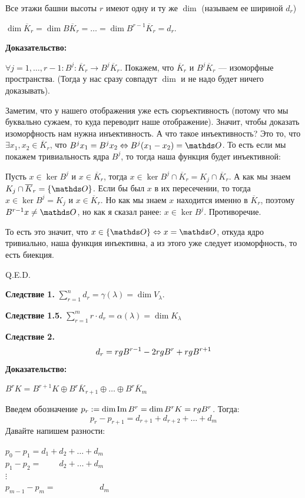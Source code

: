 Все этажи башни высоты $r$ имеют одну и ту же $\dim$ (называем ее шириной $d_r$)

$\dim \overline{K}_r = \dim B \overline{K}_r = \ldots = \dim B^{r-1}\overline{K}_r = d_r$.

\textbf{Доказательство:}

$\forall j=1,\ldots,r-1:B^j: \overline{K}_r \rightarrow B^j\overline{K}_r$. Покажем, что $\overline{K}_r $ и $B^j\overline{K}_r$ --- изоморфные пространства. (Тогда у нас сразу совпадут $\dim$ и не надо будет ничего доказывать).

Заметим, что у нашего отображения уже есть сюръективность (потому что мы буквально сужаем, то куда переводит наше отображение). Значит, чтобы доказать изоморфность нам нужна инъективность. А что такое инъективность? Это то, что $\exists x_1,x_2 \in \overline{K}_r$, что $B^jx_1=B^jx_2 \Leftrightarrow B^j(x_1-x_2)=\zero$. То есть если мы покажем тривиальность ядра $B^j$, то тогда наша функция будет инъективной:

Пусть $x \in \ker B^j$ и $x\in \overline{K}_r$, тогда $x\in \ker B^j \cap \overline{K}_r = K_j \cap \overline{K}_r$. А как мы знаем $ K_j \cap \overline{K}_r = \{\zero\}$. Если бы был $x$ в их пересечении, то тогда $x \in \ker B^j =K_j$ и $x \in \overline{K}_{r}$. Но как мы знаем $x$ находится именно в $\overline{K}_r$, поэтому $B^{r-1}x \neq \zero$, но как я сказал ранее:  $x \in \ker B^j $. Противоречие.

То есть это значит, что $x \in \{\zero\} \Leftrightarrow x =\zero$, откуда ядро тривиально, наша функция инъективна, а из этого уже следует изоморфность, то есть биекция.

\hfill Q.E.D.

\textbf{Следствие 1.} $\sum\limits_{r=1}^nd_r = \gamma(\lambda) = \dim V_{\lambda}$.

\textbf{Следствие 1.5.} $\sum\limits_{r=1}^m r \cdot d_r = \alpha(\lambda)= \dim K_{\lambda}$

\textbf{Следствие 2.} 
$$d_r = rg B^{r-1}-2 rg B^r + rg B^{r+1}$$
\textbf{Доказательство:}

$B^rK = B^{r+1}K \oplus B^r\overline{K}_{r+1}\oplus\ldots\oplus B^r \overline{K}_m$

Введем обозначение $p_r:=\dim \operatorname{Im} B^r = \dim B^rK = rg B^r$. Тогда:
$$p_r - p_{r+1} = d_{r+1}+d_{r+2}+\ldots +d_m$$
Давайте напишем разности:

$p_0-p_1 = d_1 + d_2 +\ldots + d_m$\\
$p_1-p_2 = \quad\quad\, d_2 + \ldots + d_m$\\
$\vdots$\\
$p_{m-1}-p_m = \quad\quad\quad\quad \quad \,\,d_m$

